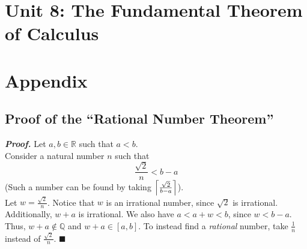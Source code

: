\documentclass[11pt]{article}
\def\Q{{\mathbb Q}}
\def\R{{\mathbb R}}
\DeclarePairedDelimiter\ceil{\lceil}{\rceil}
\newenvironment{proof}{\par\textit{\textbf{Proof.}}}{\hfill$\blacksquare$}
\begin{document}
\section{Unit 8: The Fundamental Theorem of Calculus}
\section{Appendix}
\subsection{Proof of the ``Rational Number Theorem''}
\begin{proof}
    Let $a,b\in\R$ such that $a<b$. \\
    Consider a natural number $n$ such that
    $$
        \frac{\sqrt 2}{n}<b-a
    $$
    (Such a number can be found by taking $\ceil*{\frac{\sqrt 2}{b-a}}$). \\
    Let $w=\frac{\sqrt{2}}{n}$. Notice that $w$ is an irrational number, since $\sqrt{2}$ is irrational. Additionally, $w+a$ is irrational. We also have $a<a+w<b$, since $w<b-a$. Thus, $w+a\notin\Q$ and $w+a\in[a,b]$. To instead find a \textit{rational} number, take $\frac{1}{n}$ instead of $\frac{\sqrt{2}}{n}$.
\end{proof}
\end{document}
